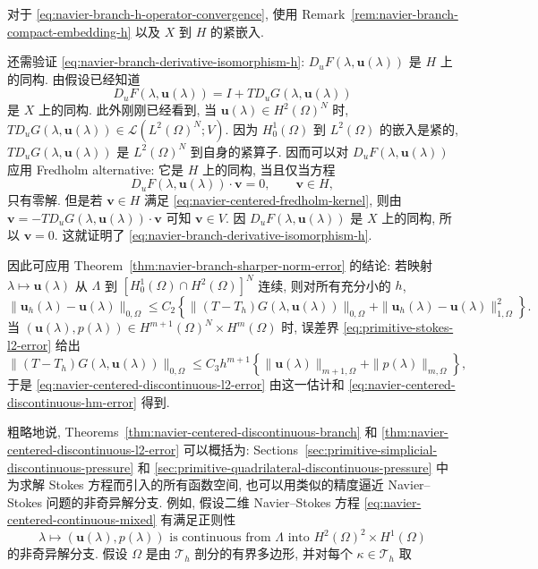 \begin{Proof}
对于 \eqref{eq:navier-branch-h-operator-convergence}, 使用
Remark~\ref{rem:navier-branch-compact-embedding-h} 以及 $X$ 到 $H$ 的紧嵌入.

还需验证 \eqref{eq:navier-branch-derivative-isomorphism-h}:
$D_uF(\lambda,\boldsymbol u(\lambda))$ 是 $H$ 上的同构. 由假设已经知道
\[
D_uF(\lambda,\boldsymbol u(\lambda))
=I+TD_uG(\lambda,\boldsymbol u(\lambda))
\]
是 $X$ 上的同构. 此外刚刚已经看到, 当
$\boldsymbol u(\lambda)\in H^2(\Omega)^N$ 时,
$TD_uG(\lambda,\boldsymbol u(\lambda))
\in\mathcal L(L^2(\Omega)^N;V)$. 因为 $H_0^1(\Omega)$ 到 $L^2(\Omega)$
的嵌入是紧的, $TD_uG(\lambda,\boldsymbol u(\lambda))$ 是
$L^2(\Omega)^N$ 到自身的紧算子. 因而可以对
$D_uF(\lambda,\boldsymbol u(\lambda))$ 应用 Fredholm alternative:
它是 $H$ 上的同构, 当且仅当方程
\begin{equation}\label{eq:navier-centered-fredholm-kernel}
D_uF(\lambda,\boldsymbol u(\lambda))\cdot\boldsymbol v=0,
\qquad\boldsymbol v\in H,
\end{equation}
只有零解. 但是若 $\boldsymbol v\in H$ 满足
\eqref{eq:navier-centered-fredholm-kernel}, 则由
$\boldsymbol v=-TD_uG(\lambda,\boldsymbol u(\lambda))\cdot\boldsymbol v$
可知 $\boldsymbol v\in V$. 因 $D_uF(\lambda,\boldsymbol u(\lambda))$
是 $X$ 上的同构, 所以 $\boldsymbol v=0$. 这就证明了
\eqref{eq:navier-branch-derivative-isomorphism-h}.

因此可应用 Theorem~\ref{thm:navier-branch-sharper-norm-error} 的结论:
若映射 $\lambda\mapsto\boldsymbol u(\lambda)$ 从 $\Lambda$ 到
$[H_0^1(\Omega)\cap H^2(\Omega)]^N$ 连续, 则对所有充分小的 $h$,
\[
\|\boldsymbol u_h(\lambda)-\boldsymbol u(\lambda)\|_{0,\Omega}
\leq C_2\left\{
\|(T-T_h)G(\lambda,\boldsymbol u(\lambda))\|_{0,\Omega}
+\|\boldsymbol u_h(\lambda)-\boldsymbol u(\lambda)\|_{1,\Omega}^2
\right\}.
\]
当 $(\boldsymbol u(\lambda),p(\lambda))
\in H^{m+1}(\Omega)^N\times H^m(\Omega)$ 时,
误差界 \eqref{eq:primitive-stokes-l2-error} 给出
\[
\|(T-T_h)G(\lambda,\boldsymbol u(\lambda))\|_{0,\Omega}
\leq C_3h^{m+1}\left\{
\|\boldsymbol u(\lambda)\|_{m+1,\Omega}
+\|p(\lambda)\|_{m,\Omega}\right\},
\]
于是 \eqref{eq:navier-centered-discontinuous-l2-error} 由这一估计和
\eqref{eq:navier-centered-discontinuous-hm-error} 得到.
\end{Proof}

粗略地说, Theorems~\ref{thm:navier-centered-discontinuous-branch} 和
\ref{thm:navier-centered-discontinuous-l2-error} 可以概括为:
Sections~\ref{sec:primitive-simplicial-discontinuous-pressure} 和
\ref{sec:primitive-quadrilateral-discontinuous-pressure} 中为求解 Stokes 方程而引入的所有函数空间,
也可以用类似的精度逼近 Navier--Stokes 问题的非奇异解分支. 例如, 假设二维
Navier--Stokes 方程 \eqref{eq:navier-centered-continuous-mixed} 有满足正则性
\begin{equation}\label{eq:navier-centered-two-dimensional-regularity}
\lambda\mapsto(\boldsymbol u(\lambda),p(\lambda))
\text{ is continuous from }\Lambda\text{ into }H^2(\Omega)^2\times H^1(\Omega)
\end{equation}
的非奇异解分支. 假设 $\Omega$ 是由 $\mathcal T_h$ 剖分的有界多边形,
并对每个 $\kappa\in\mathcal T_h$ 取
